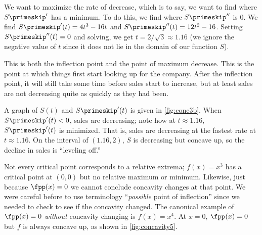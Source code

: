 {We want to maximize the rate of decrease, which is to say, we want to find where $S\primeskip'$ has a minimum.  To do this, we find where $S\primeskip''$ is 0.  We find $S\primeskip'(t)=4t^3-16t$ and $S\primeskip''(t)=12t^2-16$.  Setting $S\primeskip''(t)=0$ and solving, we get $t=2/\sqrt3\approx 1.16$ (we ignore the negative value of $t$ since it does not lie in the domain of our function $S$).

\begin{center}
\end{center}

This is both the inflection point and the point of maximum decrease.  This is the point at which things first start looking up for the company.  After the inflection point, it will still take some time before sales start to increase, but at least sales are not decreasing quite as quickly as they had been.


A graph of $S(t)$ and $S\primeskip'(t)$ is given in \autoref{fig:conc3b}. When $S\primeskip'(t)<0$, sales are decreasing; note how at $t\approx 1.16$, $S\primeskip'(t)$ is minimized. That is, sales are decreasing at the fastest rate at $t\approx 1.16$.  On the interval of $(1.16,2)$, $S$ is decreasing but concave up, so the decline in sales is ``leveling off.''}


Not every critical point corresponds to a relative extrema; $f(x)=x^3$ has a critical point at $(0,0)$ but no relative maximum or minimum. Likewise, just because $\fpp(x)=0$ we cannot conclude concavity changes at that point. We were careful before to use terminology ``\textit{possible} point of inflection'' since we needed to check to see if the concavity changed. The canonical example of $\fpp(x)=0$ \textit{without} concavity changing is $f(x)=x^4$. At $x=0$, $\fpp(x)=0$ but $f$ is always concave up, as shown in \autoref{fig:concavity5}.

